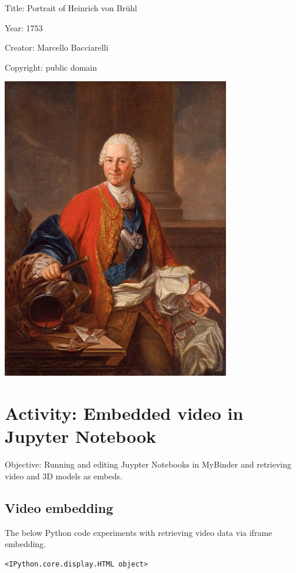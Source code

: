 \documentclass[
  letterpaper,
]{book}
\begin{document}
Title: Portrait of Heinrich von Brühl

Year: 1753

Creator: Marcello Bacciarelli

Copyright: public domain

\includegraphics{paintings_files/figure-pdf/cell-2-output-18.png}


\hypertarget{activity-embedded-video-in-jupyter-notebook}{%
\chapter{Activity: Embedded video in Jupyter
Notebook}\label{activity-embedded-video-in-jupyter-notebook}}

Objective: Running and editing Juypter Notebooks in MyBinder and
retrieving video and 3D models as embeds.

\hypertarget{video-embedding}{%
\section{Video embedding}\label{video-embedding}}

The below Python code experiments with retrieving video data via iframe
embedding.

\begin{verbatim}
<IPython.core.display.HTML object>
\end{verbatim}
\end{document}
